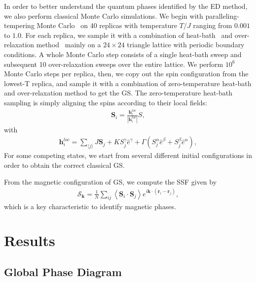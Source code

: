 \documentclass[aps,prb,reprint,amsfonts,amsmath,amssymb,showpacs,groupedaddress,superscriptaddress]{revtex4-1}
\begin{document}
In order to better understand the quantum phases identified by the ED method, we also perform classical Monte Carlo simulations. We begin with paralleling-tempering Monte Carlo~\cite{Hukushima96} on 40 replicas with temperature $T/J$ ranging from $0.001$ to $1.0$. For each replica, we sample it with a combination of heat-bath~\cite{Miyatake84} and over-relaxation method~\cite{Berg} mainly on a $24 \times 24$ triangle lattice with periodic boundary conditions. A whole Monte Carlo step consists of a single heat-bath sweep and subsequent 10 over-relaxation sweeps over the entire lattice. We perform $10^6$ Monte Carlo steps per replica, then, we copy out the spin configuration from the lowest-T replica, and sample it with a combination of zero-temperature heat-bath and over-relaxation method to get the GS. The zero-temperature heat-bath sampling is simply aligning the spins according to their local fields:
\begin{align}
    \bm{S}_{i} = \frac{\bm{h}_{i}^{loc}}{|\bm{h}_{i}^{loc}|} S,
\end{align}
with
\begin{align}
    \bm{h}_{i}^{loc} = \sum_{\langle j \rangle} J \bm{S}_{j} + K {S}^{\gamma}_{j} \hat{e}^{\gamma} + \Gamma (S^{\alpha}_{j} \hat{e}^{\beta} + S^{\beta}_{j} \hat{e}^{\alpha}),
\end{align}
For some competing states, we start from several different initial configurations in order to obtain the correct classical GS.

From the magnetic configuration of GS, we compute the SSF given by
\begin{align}
    \mathcal{S}_{\bm{k}} = \frac{1}{N} \sum_{ij} \left \langle \bm{S}_i \cdot \bm{S}_j \right \rangle e^{i \bm{k} \cdot (\bm{r}_i-\bm{r}_j)},
\end{align}
which is a key characteristic to identify magnetic phases.

\section{\label{sec:Results}Results}

\subsection{\label{subsec:GlobalPhaseDiagram}Global Phase Diagram}
\end{document}
